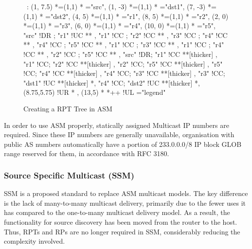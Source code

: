 \begin{figure}[ht]
\label{fig:asm-rpt}

\begin{center}

\ \xy<1cm,0cm>:
(1, 7.5)  *=(1,1) 	  	*\frm{-}  ="src",
(1, -3)   *=(1,1) 	*\frm{-}  ="dst1",
(7, -3)   *=(1,1) 	*\frm{-}  ="dst2",
%
(4,  5)   *=(1,1)  *   ="r1",
(8,  5)   *=(1,1)  *   ="r2",
(2,  0)   *=(1,1)  *   ="r3",
(6,  0)   *=(1,1)  *   ="r4",
(10, 0)   *=(1,1)  *   ="r5",
%
"src" !DR ; "r1" !UC **\dir{~} ,
%
"r1" !CC ; "r2" !CC **\dir{~} ,
"r3" !CC ; "r4" !CC **\dir{~} ,
"r4" !CC ; "r5" !CC **\dir{~} ,
"r1" !CC ; "r3" !CC **\dir{~} ,
"r1" !CC ; "r4" !CC **\dir{~} ,
"r2" !CC ; "r5" !CC **\dir{~} ,
%
"src" !DR; "r1"   !CC **[thicker]\dir{=} ,
"r1"  !CC; "r2"   !CC **[thicker]\dir{=} ,
"r2"  !CC; "r5"   !CC **[thicker]\dir{=} ,
"r5"  !CC; "r4"   !CC **[thicker]\dir{=} ,
"r4"  !CC; "r3"   !CC **[thicker]\dir{=} ,
"r3"  !CC; "dst1" !UC **[thicker]\dir{=} *,
"r4"  !CC; "dst2" !UC **[thicker]\dir{=} *,
%
\POS (8.75,5.75) !UR * ,
%
\POS (13,5) * *++\frm{-} !UL ="legend"
\endxy

\end{center}

\caption{Creating a RPT Tree in ASM}

\end{figure}


In order to use ASM properly, statically assigned Multicast IP numbers
are required. Since these IP numbers are generally unavailable,
organisation with public AS numbers automatically have a portion of
233.0.0.0/8 IP block GLOB range reserved for them, in accordance with 
RFC 3180.

\subsubsection{Source Specific Multicast (SSM)}
\label{sec:ssm}

SSM is a proposed standard to replace ASM multicast models. The key
difference is the lack of many-to-many multicast delivery, primarily due
to the fewer uses it has compared to the one-to-many multicast delivery
model. As a result, the functionality for source discovery has been
moved from the router to the host. Thus, RPTs and RPs are no longer
required in SSM, considerably reducing the complexity involved.


